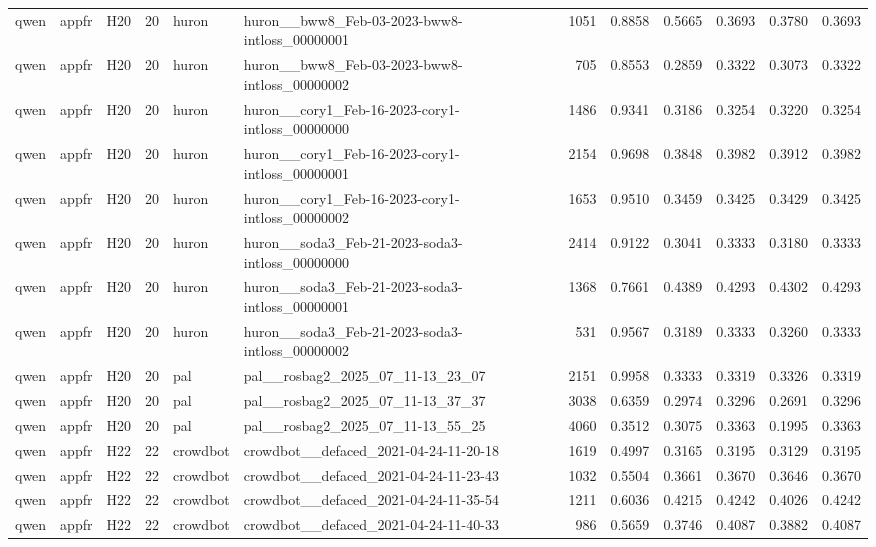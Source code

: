 \begin{table}[tbp]
\begin{tabular}{lllrllrrrrrr}
qwen & appfr & H20 & 20 & huron & huron\_\_bww8\_Feb-03-2023-bww8-intloss\_00000001 & 1051 & 0.8858 & 0.5665 & 0.3693 & 0.3780 & 0.3693 \\
qwen & appfr & H20 & 20 & huron & huron\_\_bww8\_Feb-03-2023-bww8-intloss\_00000002 & 705 & 0.8553 & 0.2859 & 0.3322 & 0.3073 & 0.3322 \\
qwen & appfr & H20 & 20 & huron & huron\_\_cory1\_Feb-16-2023-cory1-intloss\_00000000 & 1486 & 0.9341 & 0.3186 & 0.3254 & 0.3220 & 0.3254 \\
qwen & appfr & H20 & 20 & huron & huron\_\_cory1\_Feb-16-2023-cory1-intloss\_00000001 & 2154 & 0.9698 & 0.3848 & 0.3982 & 0.3912 & 0.3982 \\
qwen & appfr & H20 & 20 & huron & huron\_\_cory1\_Feb-16-2023-cory1-intloss\_00000002 & 1653 & 0.9510 & 0.3459 & 0.3425 & 0.3429 & 0.3425 \\
qwen & appfr & H20 & 20 & huron & huron\_\_soda3\_Feb-21-2023-soda3-intloss\_00000000 & 2414 & 0.9122 & 0.3041 & 0.3333 & 0.3180 & 0.3333 \\
qwen & appfr & H20 & 20 & huron & huron\_\_soda3\_Feb-21-2023-soda3-intloss\_00000001 & 1368 & 0.7661 & 0.4389 & 0.4293 & 0.4302 & 0.4293 \\
qwen & appfr & H20 & 20 & huron & huron\_\_soda3\_Feb-21-2023-soda3-intloss\_00000002 & 531 & 0.9567 & 0.3189 & 0.3333 & 0.3260 & 0.3333 \\
qwen & appfr & H20 & 20 & pal & pal\_\_rosbag2\_2025\_07\_11-13\_23\_07 & 2151 & 0.9958 & 0.3333 & 0.3319 & 0.3326 & 0.3319 \\
qwen & appfr & H20 & 20 & pal & pal\_\_rosbag2\_2025\_07\_11-13\_37\_37 & 3038 & 0.6359 & 0.2974 & 0.3296 & 0.2691 & 0.3296 \\
qwen & appfr & H20 & 20 & pal & pal\_\_rosbag2\_2025\_07\_11-13\_55\_25 & 4060 & 0.3512 & 0.3075 & 0.3363 & 0.1995 & 0.3363 \\
qwen & appfr & H22 & 22 & crowdbot & crowdbot\_\_defaced\_2021-04-24-11-20-18 & 1619 & 0.4997 & 0.3165 & 0.3195 & 0.3129 & 0.3195 \\
qwen & appfr & H22 & 22 & crowdbot & crowdbot\_\_defaced\_2021-04-24-11-23-43 & 1032 & 0.5504 & 0.3661 & 0.3670 & 0.3646 & 0.3670 \\
qwen & appfr & H22 & 22 & crowdbot & crowdbot\_\_defaced\_2021-04-24-11-35-54 & 1211 & 0.6036 & 0.4215 & 0.4242 & 0.4026 & 0.4242 \\
qwen & appfr & H22 & 22 & crowdbot & crowdbot\_\_defaced\_2021-04-24-11-40-33 & 986 & 0.5659 & 0.3746 & 0.4087 & 0.3882 & 0.4087 \\

\end{tabular}
\end{table}
